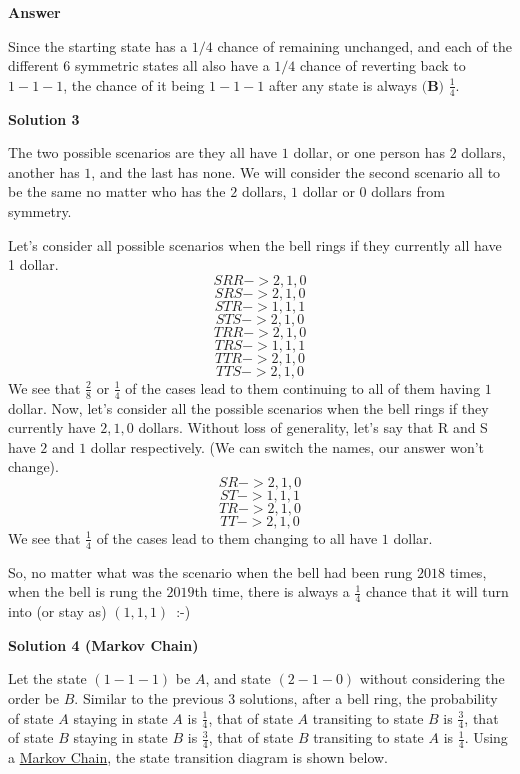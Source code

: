 \begin{enumerate}
 
\textbf{Answer}

 Since the starting state has a $1/4$ chance of remaining unchanged, and each of the different 6 symmetric states all also have a $1/4$ chance of reverting back to $1-1-1$, the chance of it being $1-1-1$ after any state is always $\boxed{\textbf{(B) } \frac{1}{4}}$.

 



\textbf{Solution 3}

The two possible scenarios are they all have $1$ dollar, or one person has $2$ dollars, another has $1$, and the last has none. We will consider the second scenario all to be the same no matter who has the $2$ dollars, $1$ dollar or $0$ dollars from symmetry.

 Let's consider all possible scenarios when the bell rings if they currently all have 1 dollar.
 \[SRR -> 2, 1, 0\]
 \[SRS -> 2, 1, 0\]
 \[STR -> 1, 1, 1\]
 \[STS -> 2, 1, 0\]
 \[TRR -> 2, 1, 0\]
 \[TRS -> 1, 1, 1\]
 \[TTR -> 2, 1, 0\]
 \[TTS -> 2, 1, 0\]	We see that $\frac{2}{8}$ or $\frac{1}{4}$ of the cases lead to them continuing to all of them having $1$ dollar.	Now, let's consider all the possible scenarios when the bell rings if they currently have $2, 1, 0$ dollars. Without loss of generality, let's say that R and S have $2$ and $1$ dollar respectively. (We can switch the names, our answer won't change).	
 \[SR -> 2, 1, 0\]
 \[ST -> 1, 1, 1\]
 \[TR -> 2, 1, 0\]
 \[TT -> 2, 1, 0\]We see that $\frac{1}{4}$ of the cases lead to them changing to all have $1$ dollar.

 So, no matter what was the scenario when the bell had been rung $2018$ times, when the bell is rung the $2019$th time, there is always a $\frac{1}{4}$ chance that it will turn into (or stay as) $(1, 1, 1)$ :-)

 



\textbf{Solution 4 (Markov Chain)}

Let the state $(1-1-1)$ be $A$, and state $(2-1-0)$ without considering the order be $B$. Similar to the previous $3$ solutions, after a bell ring, the probability of state $A$ staying in state $A$ is $\frac{1}{4}$, that of state $A$ transiting to state $B$ is $\frac{3}{4}$, that of state $B$ staying in state $B$ is $\frac{3}{4}$, that of state $B$ transiting to state $A$ is $\frac{1}{4}$. Using a \href{https://artofproblemsolving.com/wiki/index.php?title=Markov\_Chains}{Markov Chain}, the state transition diagram is shown below.


\end{enumerate}
